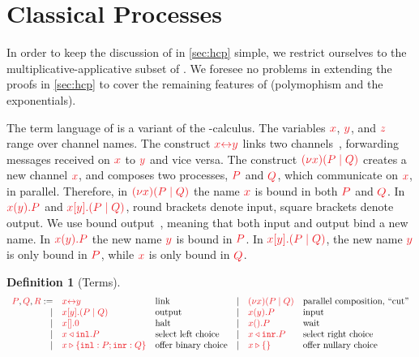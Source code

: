 \documentclass[draft,submission,copyright,creativecommons]{eptcs}
\newtheorem{definition}{Definition}
\begin{document}
\section{Classical Processes}
\label{sec:cp}

In order to keep the discussion of \hcp in \cref{sec:hcp} simple, we restrict
ourselves to the multiplicative-applicative subset of \cp.
We foresee no problems in extending the proofs in \cref{sec:hcp} to cover the
remaining features of \cp (polymophism and the exponentials).

The term language of \cp is a variant of the \textpi-calculus.
The variables $\tm{x}$, $\tm{y}$, and $\tm{z}$ range over channel names.
The construct $\tm{\cpLink{x}{y}}$ links two
channels~\cite{sangiorgi1996,boreale1998}, forwarding messages received on
$\tm{x}$ to $\tm{y}$ and vice versa.
The construct $\tm{\cpCut{x}{P}{Q}}$ creates a new channel $\tm{x}$, and composes
two processes, $\tm{P}$ and $\tm{Q}$, which communicate on $\tm{x}$, in parallel.
Therefore, in $\tm{\cpCut{x}{P}{Q}}$ the name $\tm{x}$ is bound in both $\tm{P}$
and $\tm{Q}$.
In $\tm{\cpRecv{x}{y}{P}}$ and $\tm{\cpSend{x}{y}{P}{Q}}$, round brackets denote
input, square brackets denote output.
We use bound output~\cite{sangiorgi1996}, meaning that both input and output
bind a new name.
In $\tm{\cpRecv{x}{y}{P}}$ the new name $\tm{y}$ is bound in $\tm{P}$.
In $\tm{\cpSend{x}{y}{P}{Q}}$, the new name $\tm{y}$ is only bound in $\tm{P}$,
while $\tm{x}$ is only bound in $\tm{Q}$.
\begin{definition}[Terms]\label{def:cp-terms}
  \[
    \begin{array}{rllrll}
      \tm{P}, \tm{Q}, \tm{R}
           :=& \tm{\cpLink{x}{y}}       &\text{link}
      &  \mid& \tm{\cpCut{x}{P}{Q}}     &\text{parallel composition, ``cut''}
      \\ \mid& \tm{\cpSend{x}{y}{P}{Q}} &\text{output}
      &  \mid& \tm{\cpRecv{x}{y}{P}}    &\text{input}
      \\ \mid& \tm{\cpHalt{x}}          &\text{halt}
      &  \mid& \tm{\cpWait{x}{P}}       &\text{wait}
      \\ \mid& \tm{\cpInl{x}{P}}        &\text{select left choice}
      &  \mid& \tm{\cpInr{x}{P}}        &\text{select right choice}
      \\ \mid& \tm{\cpCase{x}{P}{Q}}    &\text{offer binary choice}
      &  \mid& \tm{\cpAbsurd{x}}        &\text{offer nullary choice}
    \end{array}
  \]
\end{definition}
\end{document}
